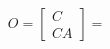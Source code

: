 \begin{equation}\label{obsv}
    O=\begin{bmatrix}
        C \\ CA
    \end{bmatrix} = 
\end{equation}